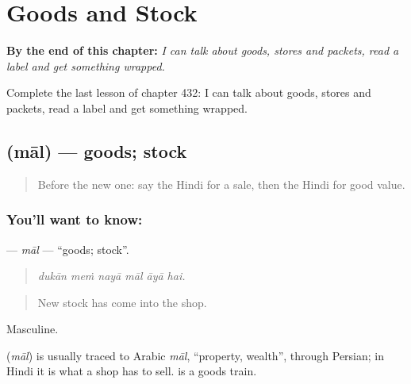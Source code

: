 
\chapter{Goods and Stock}
\label{ch:hi-goods-and-stock}

\begin{chapteropening}
\textbf{By the end of this chapter:} \emph{I can talk about goods, stores and packets, read a label and get something wrapped.}

Complete the last lesson of chapter 432: I can talk about goods, stores and packets, read a label and get something wrapped.
\end{chapteropening}

\section[\texorpdfstring{\hi{माल} (māl)}{माल (māl)}]{ (māl) — goods; stock}

\label{lesson:HI-C432-mal}



\begin{quote}
Before the new one: say the Hindi for a sale, then the Hindi for good value.
\end{quote}

\subsection*{You'll want to know: }
\textbf{} — \emph{māl} — \textquotedblleft{}goods; stock\textquotedblright{}.

\begin{quote}
     
\end{quote}

\begin{quote}
\emph{dukān meṁ nayā māl āyā hai.}
\end{quote}

\begin{quote}
New stock has come into the shop.
\end{quote}

Masculine.

\begin{cousinweb}
\textbf{} (\emph{māl}) is usually traced to Arabic \emph{māl}, \textquotedblleft{}property, wealth\textquotedblright{}, through Persian; in Hindi it is what a shop has to sell.  is a goods train.
\end{cousinweb}

